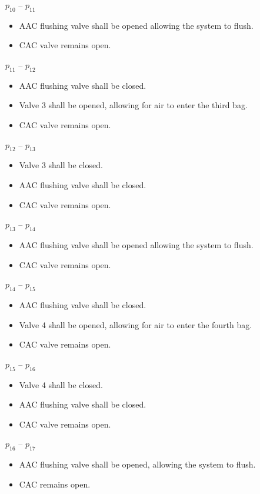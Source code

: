 \documentclass[a4paper,12pt,twoside]{article}
\begin{document}
$p_{10}$ – $p_{11}$
\begin{itemize}
    \item AAC flushing valve shall be opened allowing the system to flush.
    \item CAC valve remains open. 
\end{itemize}

  
$p_{11}$ – $p_{12}$
\begin{itemize}
    \item AAC flushing valve shall be closed.
    \item Valve 3 shall be opened, allowing for air to enter the third bag.
    \item CAC valve remains open. 
\end{itemize}

$p_{12}$ – $p_{13}$
\begin{itemize}
    \item Valve 3 shall be closed.
    \item AAC flushing valve shall be closed.
    \item CAC valve remains open.
\end{itemize}

$p_{13}$ – $p_{14}$
\begin{itemize}
    \item AAC flushing valve shall be opened allowing the system to flush.
    \item CAC valve remains open.
\end{itemize}

$p_{14}$ – $p_{15}$
\begin{itemize}
    \item AAC flushing valve shall be closed.
    \item Valve 4 shall be opened, allowing for air to enter the fourth bag.
    \item CAC valve remains open.
\end{itemize}

$p_{15}$ – $p_{16}$
\begin{itemize}
    \item Valve 4 shall be closed.
    \item AAC flushing valve shall be closed.
    \item CAC valve remains open.
\end{itemize}

$p_{16}$ – $p_{17}$
\begin{itemize}
    \item AAC flushing valve shall be opened, allowing the system to flush. 
    \item CAC remains open.
  \end{itemize}
\end{document}
